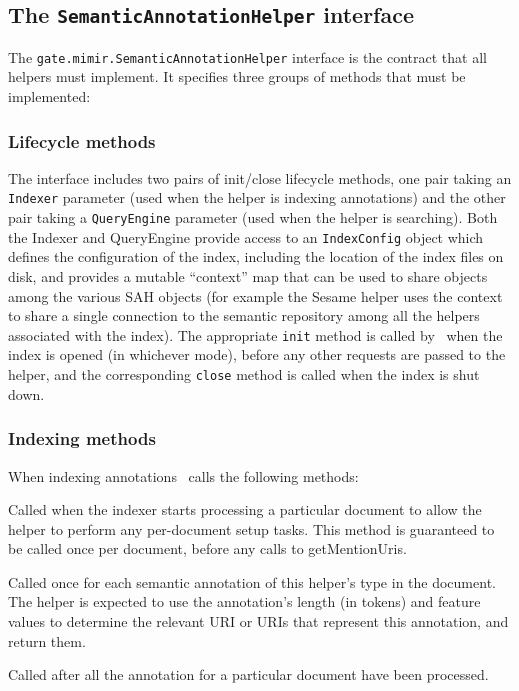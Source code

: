 \subsection{The {\tt SemanticAnnotationHelper} interface}

The {\tt gate.mimir.SemanticAnnotationHelper} interface is the contract that
all helpers must implement.  It specifies three groups of methods that must be
implemented:

\subsubsection*{Lifecycle methods}

The interface includes two pairs of init/close lifecycle methods, one pair
taking an {\tt Indexer} parameter (used when the helper is indexing
annotations) and the other pair taking a {\tt QueryEngine} parameter (used when
the helper is searching).  Both the Indexer and QueryEngine provide access to
an {\tt IndexConfig} object which defines the configuration of the index,
including the location of the index files on disk, and provides a mutable
``context'' map that can be used to share objects among the various SAH objects
(for example the Sesame helper uses the context to share a single connection to
the semantic repository among all the helpers associated with the index).  The
appropriate {\tt init} method is called by \Mimir\ when the index is opened (in
whichever mode), before any other requests are passed to the helper, and the
corresponding {\tt close} method is called when the index is shut down.

\subsubsection*{Indexing methods}

When indexing annotations \Mimir\ calls the following methods:

\bde
\item[documentStart(document)] Called when the indexer starts processing a
  particular document to allow the helper to perform any per-document setup
  tasks.  This method is guaranteed to be called once per document, before any
  calls to getMentionUris.
\item[getMentionUris(annotation, length, indexer)] Called once for each
  semantic annotation of this helper's type in the document.  The helper is
  expected to use the annotation's length (in tokens) and feature values to
  determine the relevant URI or URIs that represent this annotation, and return
  them. 
\item[documentEnd()] Called after all the annotation for a particular document
  have been processed.
\ede

